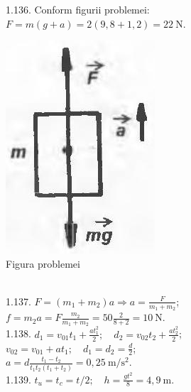 1.136. Conform figurii problemei:\\ $F=m(g+a)=2(9,8+1,2)=22 \mathrm{~N}$.\\ \begin{center} \includegraphics[width=0.4\linewidth]{images/2025_07_01_5b3ff9fa0d508c8e9f17g-227(1)}\\ Figura problemei \end{center}\\

1.137. $F=\left(m_{1}+m_{2}\right) a \Rightarrow a=\frac{F}{m_{1}+m_{2}}$;\\ $f=m_{2} a=F \frac{m_{2}}{m_{1}+m_{2}}=50 \frac{2}{8+2}=10 \mathrm{~N}$.\\

1.138. $d_{1}=v_{01} t_{1}+\frac{a t_{1}^{2}}{2}; \quad d_{2}=v_{02} t_{2}+\frac{a t_{2}^{2}}{2}$;\\ $v_{02}=v_{01}+a t_{1}; \quad d_{1}=d_{2}=\frac{d}{2}$;\\ $a=d \frac{t_{1}-t_{2}}{t_{1} t_{2}\left(t_{1}+t_{2}\right)}=0,25 \mathrm{~m} / \mathrm{s}^{2}$.\\

1.139. $t_{u}=t_{c}=t / 2; \quad h=\frac{g t^{2}}{8}=4,9 \mathrm{~m}$.\\

